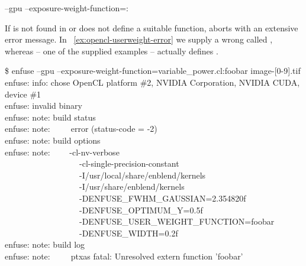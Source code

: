 \begin{literal}
  --gpu --exposure-weight-function=:\feasiblebreak
\end{literal}

If  is not found in  or does not define a suitable
function, \App{} aborts with an extensive error message.  In
\exampleName~\ref{ex:opencl-userweight-error} we supply a wrong  called
, whereas  -- one of the supplied examples --
actually defines .

\begin{exemplar}
  \begin{maxipage}
    \begin{terminal}
\$ enfuse --gpu --exposure-weight-function=variable\_power.cl:foobar image-[0-9].tif \\
enfuse: info: chose OpenCL platform \#2, NVIDIA Corporation, NVIDIA CUDA, device \#1 \\
enfuse: invalid binary \\
enfuse: note: build status \\
enfuse: note:~~~~~error (status-code = -2) \\
enfuse: note: build options \\
enfuse: note: ~~~~-cl-nv-verbose \bslash \\
~~~~~~~~~~~~~~~~~~-cl-single-precision-constant \bslash \\
~~~~~~~~~~~~~~~~~~-I/usr/local/share/enblend/kernels  \bslash \\
~~~~~~~~~~~~~~~~~~-I/usr/share/enblend/kernels \bslash \\
~~~~~~~~~~~~~~~~~~-DENFUSE\_FWHM\_GAUSSIAN=2.354820f \bslash \\
~~~~~~~~~~~~~~~~~~-DENFUSE\_OPTIMUM\_Y=0.5f \bslash \\
~~~~~~~~~~~~~~~~~~-DENFUSE\_USER\_WEIGHT\_FUNCTION=foobar \bslash \\
~~~~~~~~~~~~~~~~~~-DENFUSE\_WIDTH=0.2f \\
enfuse: note: build log \\
enfuse: note:~~~~~ptxas fatal: Unresolved extern function 'foobar'
    \end{terminal}
  \end{maxipage}

  \caption[ user-weight error]%
          {\label{ex:opencl-userweight-error}%
            Error output of \App{} for an invalid (here: unknown) user-defined 
            exposure-weight function.  The actual error output error differs for different
            graphics-card manufacturers.}
\end{exemplar}



